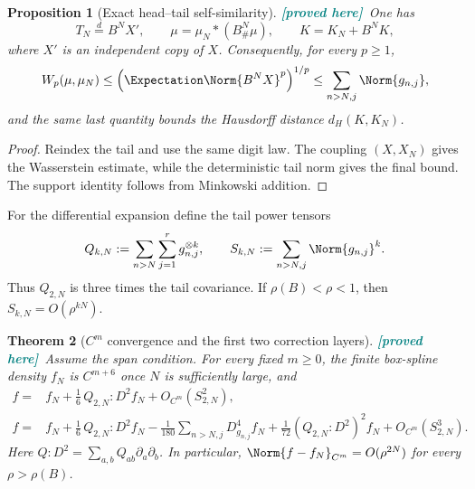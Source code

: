 \documentclass[11pt,oneside]{article}
\newtheorem{theorem}{Theorem}[section]
\newtheorem{proposition}[theorem]{Proposition}
\theoremstyle{definition}
\theoremstyle{remark}
\newcommand{\New}{\textcolor{teal}{\textbf{[proved here]}}}
\begin{document}
\begin{proposition}[Exact head--tail self-similarity]
\label{prop:head-tail}
\New\ One has
\begin{equation}
 T_N\overset d=B^NX',
 \qquad
 \mu=\mu_N*(B^N_\#\mu),
 \qquad
 K=K_N+B^NK,
 \label{eq:head-tail}
\end{equation}
where $X'$ is an independent copy of $X$.  Consequently, for every $p\ge1$,
\begin{equation}
 W_p(\mu,\mu_N)
 \le \left(\Expectation\Norm{B^NX}^p\right)^{1/p}
 \le \sum_{n>N,j}\Norm{g_{n,j}},
 \label{eq:wasserstein}
\end{equation}
and the same last quantity bounds the Hausdorff distance $d_H(K,K_N)$.
\end{proposition}

\begin{proof}
Reindex the tail and use the same digit law.  The coupling $(X,X_N)$ gives the
Wasserstein estimate, while the deterministic tail norm gives the final bound.
The support identity follows from Minkowski addition.
\end{proof}

For the differential expansion define the tail power tensors
\begin{equation}
 Q_{k,N}:=\sum_{n>N}\sum_{j=1}^r g_{n,j}^{\otimes k},
 \qquad
 S_{k,N}:=\sum_{n>N,j}\Norm{g_{n,j}}^k.
 \label{eq:tail-tensors}
\end{equation}
Thus $Q_{2,N}$ is three times the tail covariance.  If
$\rho(B)<\rho<1$, then $S_{k,N}=O(\rho^{kN})$.

\begin{theorem}[$C^m$ convergence and the first two correction layers]
\label{thm:Cm-expansion}
\New\ Assume the span condition.  For every fixed $m\ge0$, the finite box-spline
density $f_N$ is $C^{m+6}$ once $N$ is sufficiently large, and
\begin{align}
 f={}&f_N+\frac16\,Q_{2,N}:D^2f_N+O_{C^m}(S_{2,N}^2),
 \label{eq:first-correction}\\
 f={}&f_N+\frac16\,Q_{2,N}:D^2f_N
 -\frac1{180}\sum_{n>N,j}D_{g_{n,j}}^4f_N
 +\frac1{72}(Q_{2,N}:D^2)^2f_N
 +O_{C^m}(S_{2,N}^3).
 \label{eq:second-correction}
\end{align}
Here $Q:D^2=\sum_{a,b}Q_{ab}\partial_a\partial_b$.  In particular,
$\Norm{f-f_N}_{C^m}=O(\rho^{2N})$ for every $\rho>\rho(B)$.
\end{theorem}
\end{document}
